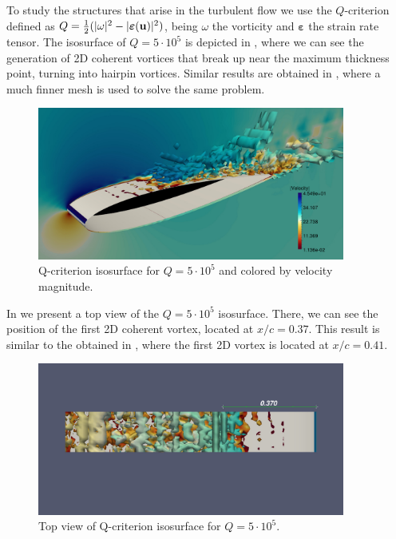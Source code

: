 To study the structures that arise in the turbulent flow we use the $Q$-criterion defined as $ Q=\frac{1}{2}(|\omega|^2-|\boldsymbol{\varepsilon}({\bf u})|^2) $, being $ \omega $ the vorticity and $ \boldsymbol{\varepsilon} $ the strain rate tensor. The isosurface of $ Q=5\cdot 10^5$ is depicted in , where we can see the generation of 2D coherent vortices that break up near the maximum thickness point, turning into hairpin vortices. Similar results are obtained in \cite{Kojima}, where a much finner mesh is used to solve the same problem.
\begin{figure}[h!]
  \centering
  \includegraphics[width=0.9\textwidth]{Figures/Chapter8/weak/Q_criterion_3d}
  \caption{Q-criterion isosurface for $ Q=5\cdot10^5 $ and colored by velocity magnitude.}
  \label{fig-NACA_3D_Q}
\end{figure}
In  we present a top view of the $ Q=5\cdot 10^5 $ isosurface. There, we can see the position of the first 2D coherent vortex, located at $ x/c=0.37 $. This result is similar to the obtained in \cite{Kojima}, where the first 2D vortex is located at $ x/c=0.41 $.
\begin{figure}[h!]
  \centering
  \includegraphics[width=0.9\textwidth,clip=true,trim=2cm 9cm 2cm 6cm]{Figures/Chapter8/weak/Q_criterion_rule}
  \caption{Top view of Q-criterion isosurface for $ Q=5\cdot10^5 $.}
  \label{fig-NACA_3D_Q_top}
\end{figure}

